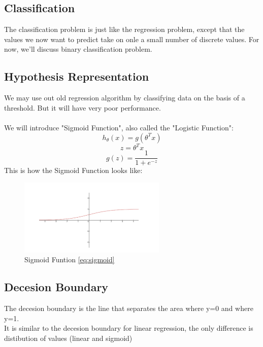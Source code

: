 \documentclass[12pt]{report}
\begin{document}
  \subsection{Classification}
    The classification problem is just like the regression problem, except that the values we now want to predict take on onle a small number of discrete values. For now, we'll discuss binary classification problem.

  \subsection{Hypothesis Representation}
    We may use out old regression algorithm by classifying data on the basis of a threshold. But it will have very poor performance.\\ 
    \\We will introduce "Sigmoid Function", also called the "Logistic Function":
    \begin{equation}
      h_\theta(x) = g(\theta^{T}x)
    \end{equation}
    \begin{equation}
      z = \theta^{T}x
    \end{equation}
    \begin{equation}\label{eq:sigmoid}
      g(z) = \frac{1}{1+e^{-z}}
    \end{equation}
    This is how the Sigmoid Function looks like:
    \begin{figure}[h]
      \centering
      \includegraphics[scale = 0.15]{sigmoid.png}
      \caption{Sigmoid Funtion \ref{eq:sigmoid}}
    \end{figure}

  \subsection{Decesion Boundary}
    The decesion boundary is the line that separates the area where y=0 and where y=1.\\
    It is similar to the decesion boundary for linear regression, the only difference is distibution of values (linear and sigmoid)
\end{document}
